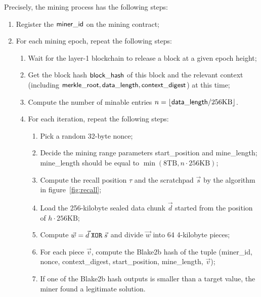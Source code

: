 Precisely, the mining process has the following steps:
\begin{enumerate}
	\item Register the $\sf miner\_id$ on the mining contract;
	\item For each mining epoch, repeat the following steps:
	\begin{enumerate}
		\item Wait for the layer-1 blockchain to release a block at a given epoch height;
		\item Get the block hash $\sf block\_hash$ of this block and the relevant context (including ${\sf merkle\_root, data\_length, context\_digest}$) at this time;
		\item Compute the number of minable entries $n=\lfloor {\sf data\_length} / 256\text{KB} \rfloor$.
		\item For each iteration, repeat the following steps:
		\begin{enumerate}
			\item Pick a random 32-byte {\sf nonce};
			\item Decide the mining range parameters {\sf start\_position} and {\sf mine\_length}; {\sf mine\_length} should be equal to $\min(8\text{TB},n\cdot 256\text{KB})$;
			\item Compute the recall position $\tau$ and the scratchpad $\vec{s}$ by the algorithm in figure~\ref{fig:recall};
			\item Load the 256-kilobyte sealed data chunk $\vec{d}$ started from the position of $h\cdot 256\text{KB}$;
			\item Compute $\vec{w}=\vec{d}{\;\tt XOR\; }\vec{s}$ and divide $\vec{w}$ into 64 4-kilobyte pieces;
			\item For each piece $\vec{v}$, compute the Blake2b hash of the tuple ({\sf miner\_id}, {\sf nonce}, {\sf context\_digest}, {\sf start\_position}, {\sf mine\_length}, $\vec{v}$); 
			\item If one of the Blake2b hash outputs is smaller than a target value, the miner found a legitimate {\sproof} solution.
		\end{enumerate}
	\end{enumerate}
\end{enumerate}

